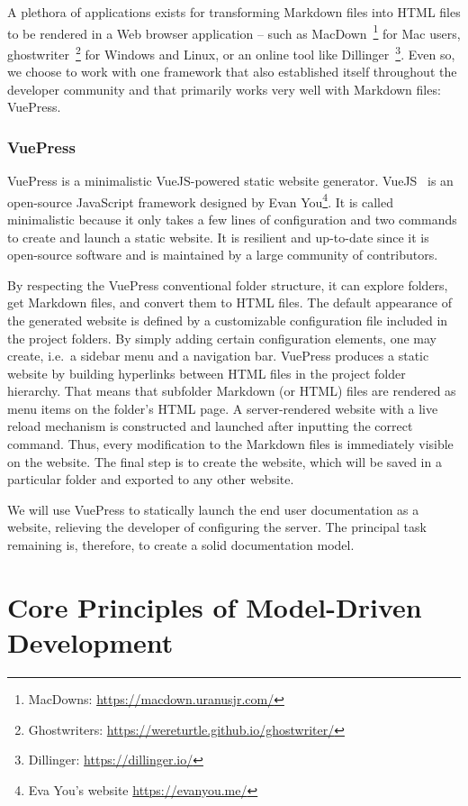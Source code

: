A plethora of applications exists for transforming Markdown files into HTML files to be rendered in a Web browser application -- such as MacDown~\footnote[1]{MacDowns: \url{https://macdown.uranusjr.com/}} for Mac users, ghostwriter~\footnote[2]{Ghostwriters: \url{https://wereturtle.github.io/ghostwriter/}} for Windows and Linux, or an online tool like Dillinger~\footnote[3]{Dillinger: \url{https://dillinger.io/}}. Even so, we choose to work with one framework that also established itself throughout the developer community and that primarily works very well with Markdown files: VuePress.

\subsubsection{VuePress}\label{sec:VP}

VuePress is a minimalistic VueJS-powered static website generator. VueJS~\cite{vuepress} is an open-source JavaScript framework designed by Evan You\footnote[4]{Eva You's website \url{https://evanyou.me/}}. It is called minimalistic because it only takes a few lines of configuration and two commands to create and launch a static website. It is resilient and up-to-date since it is open-source software and is maintained by a large community of contributors.

By respecting the VuePress conventional folder structure, it can explore folders, get Markdown files, and convert them to HTML files. The default appearance of the generated website is defined by a customizable configuration file included in the project folders. By simply adding certain configuration elements, one may create, i.e.~a sidebar menu and a navigation bar. VuePress produces a static website by building hyperlinks between HTML files in the project folder hierarchy. That means that subfolder Markdown (or HTML) files are rendered as menu items on the folder's HTML page. A server-rendered website with a live reload mechanism is constructed and launched after inputting the correct command. Thus, every modification to the Markdown files is immediately visible on the website. The final step is to create the website, which will be saved in a particular folder and exported to any other website.

We will use VuePress to statically launch the end user documentation as a website, relieving the developer of configuring the server. The principal task remaining is, therefore, to create a solid documentation model.

\section{Core Principles of Model-Driven Development}


